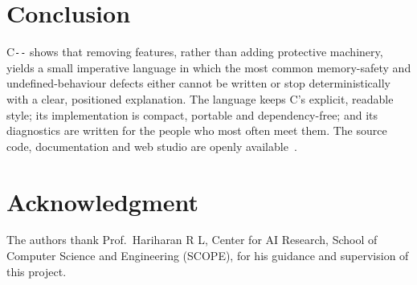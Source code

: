 \documentclass[conference]{IEEEtran}
\newcommand{\cmm}{C\texttt{-{}-}}
\begin{document}
\section{Conclusion}
\cmm{} shows that removing features, rather than adding protective machinery, yields a small imperative
language in which the most common memory-safety and undefined-behaviour defects either cannot be written or
stop deterministically with a clear, positioned explanation. The language keeps C's explicit, readable
style; its implementation is compact, portable and dependency-free; and its diagnostics are written for the
people who most often meet them. The source code, documentation and web studio are openly
available~\cite{cmm_repo}.

\section*{Acknowledgment}
The authors thank Prof.\ Hariharan R L, Center for AI Research, School of Computer Science and Engineering
(SCOPE), for his guidance and supervision of this project.



\end{document}
